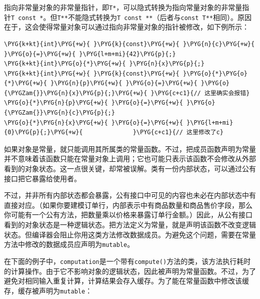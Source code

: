 指向非常量对象的非常量指针，即\texttt{T*}，可以隐式转换为指向常量对象的非常量指针\texttt{T const *}。但\texttt{T**}不能隐式转换为\texttt{T const **}（后者与\texttt{const T**}相同）。原因在于，这会使得常量对象可以通过指向非常量对象的指针被修改，如下例所示：



\begin{codeblockbg}
\begin{Verbatim}[commandchars=\\\{\},breaklines=true,breakanywhere=true,fontsize=\codefont,xleftmargin=17bp]
\PYG{k+kt}{int}\PYG{+w}{ }\PYG{k}{const}\PYG{+w}{ }\PYG{n}{c}\PYG{+w}{ }\PYG{o}{=}\PYG{+w}{ }\PYG{l+m+mi}{42}\PYG{p}{;}
\PYG{k+kt}{int}\PYG{o}{*}\PYG{+w}{ }\PYG{n}{x}\PYG{p}{;}
\PYG{k+kt}{int}\PYG{+w}{ }\PYG{k}{const}\PYG{+w}{ }\PYG{o}{*}\PYG{o}{*}\PYG{+w}{ }\PYG{n}{p}\PYG{+w}{ }\PYG{o}{=}\PYG{+w}{ }\PYG{o}{\PYGZam{}}\PYG{n}{x}\PYG{p}{;}\PYG{+w}{ }\PYG{c+c1}{// 这里确实会报错}
\PYG{o}{*}\PYG{n}{p}\PYG{+w}{ }\PYG{o}{=}\PYG{+w}{ }\PYG{o}{\PYGZam{}}\PYG{n}{c}\PYG{p}{;}
\PYG{o}{*}\PYG{n}{x}\PYG{+w}{ }\PYG{o}{=}\PYG{+w}{ }\PYG{l+m+mi}{0}\PYG{p}{;}\PYG{+w}{              }\PYG{c+c1}{// 这里修改了c}
\end{Verbatim}
\end{codeblockbg}



如果对象是常量，就只能调用其所属类的常量函数。不过，把成员函数声明为常量并不意味着该函数只能在常量对象上调用；它也可能只表示该函数不会修改从外部看到的对象状态。这一点很关键，却常被误解。类有一份内部状态，可以通过公有接口把它暴露给使用者。



不过，并非所有内部状态都会暴露，公有接口中可见的内容也未必在内部状态中有直接对应。（如果你要建模订单行，内部表示中有商品数量和商品售价字段，那么你可能有一个公有方法，把数量乘以价格来暴露订单行金额。）因此，从公有接口看到的对象状态是一种逻辑状态。把方法定义为常量，就是声明该函数不改变逻辑状态。但编译器会阻止你用这类方法修改数据成员。为避免这个问题，需要在常量方法中修改的数据成员应声明为\texttt{mutable}。



在下面的例子中，\texttt{computation}是一个带有\texttt{compute()}方法的类，该方法执行耗时的计算操作。由于它不影响对象的逻辑状态，因此被声明为常量函数。不过，为了避免对相同输入重复计算，计算结果会存入缓存。为了能在常量函数中修改该缓存，缓存被声明为\texttt{mutable}：



